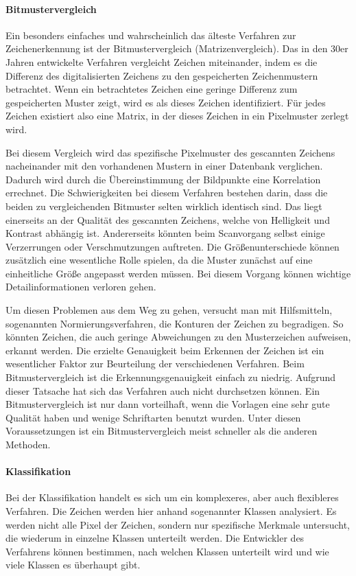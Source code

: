 \paragraph{Bitmustervergleich}
Ein besonders einfaches und wahrscheinlich das älteste Verfahren zur Zeichenerkennung ist der Bitmustervergleich (Matrizenvergleich). Das in den 30er Jahren entwickelte Verfahren vergleicht Zeichen miteinander, indem es die Differenz des digitalisierten Zeichens zu den gespeicherten Zeichenmustern betrachtet. Wenn ein betrachtetes Zeichen eine geringe Differenz zum gespeicherten Muster zeigt, wird es als dieses Zeichen identifiziert. Für jedes Zeichen existiert also eine Matrix, in der dieses Zeichen in ein Pixelmuster zerlegt wird. \cite{OCRB}


Bei diesem Vergleich wird das spezifische Pixelmuster des gescannten Zeichens nacheinander mit den vorhandenen Mustern in einer Datenbank verglichen. Dadurch wird durch die Übereinstimmung der Bildpunkte eine Korrelation errechnet. Die Schwierigkeiten bei diesem Verfahren bestehen darin, dass die beiden zu vergleichenden Bitmuster selten wirklich identisch sind. Das liegt einerseits an der Qualität des gescannten Zeichens, welche von Helligkeit und Kontrast abhängig ist. Andererseits könnten beim Scanvorgang selbst einige Verzerrungen oder Verschmutzungen auftreten. Die Größenunterschiede können zusätzlich eine wesentliche Rolle spielen, da die Muster zunächst auf eine einheitliche Größe angepasst werden müssen. Bei diesem Vorgang können wichtige Detailinformationen verloren gehen. \cite{OCRB}

Um diesen Problemen aus dem Weg zu gehen, versucht man mit Hilfsmitteln, sogenannten Normierungsverfahren, die Konturen der Zeichen zu begradigen. So könnten Zeichen, die auch geringe Abweichungen zu den Musterzeichen aufweisen, erkannt werden. Die erzielte Genauigkeit beim Erkennen der Zeichen ist ein wesentlicher Faktor zur Beurteilung der verschiedenen Verfahren. Beim Bitmustervergleich ist die Erkennungsgenauigkeit einfach zu niedrig. Aufgrund dieser Tatsache hat sich das Verfahren auch nicht durchsetzen können. Ein Bitmustervergleich ist nur dann vorteilhaft, wenn die Vorlagen eine sehr gute Qualität haben und wenige Schriftarten benutzt wurden. Unter diesen Voraussetzungen ist ein Bitmustervergleich meist schneller als die anderen Methoden. \cite{OCRB}

\paragraph{Klassifikation}
Bei der Klassifikation handelt es sich um ein komplexeres, aber auch flexibleres Verfahren. Die Zeichen werden hier anhand sogenannter Klassen analysiert. Es werden nicht alle Pixel der Zeichen, sondern nur spezifische Merkmale untersucht, die wiederum in einzelne Klassen unterteilt werden. Die Entwickler des Verfahrens können bestimmen, nach welchen Klassen unterteilt wird und wie viele Klassen es überhaupt gibt. \cite{OCRB}


